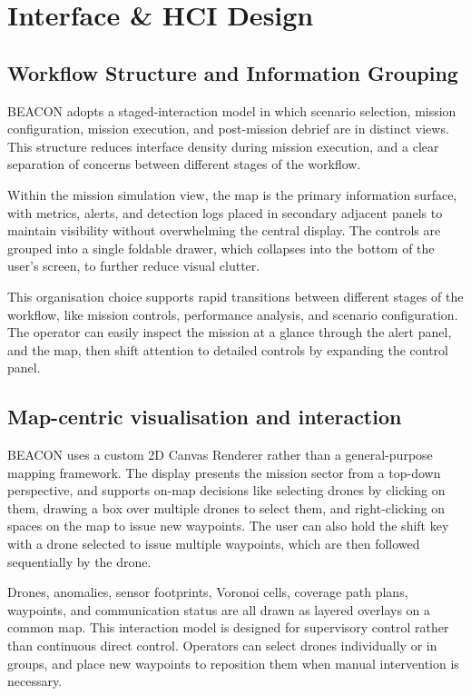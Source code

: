 \section{Interface \& HCI Design}\label{sec:interface-and-hci-design}

\subsection{Workflow Structure and Information Grouping}\label{subsec:workflow-structure-and-information-grouping}

BEACON adopts a staged-interaction model in which scenario selection, mission configuration, mission execution, and post-mission debrief are in distinct views.
This structure reduces interface density during mission execution, and a clear separation of concerns between different stages of the workflow.

Within the mission simulation view, the map is the primary information surface, with metrics, alerts, and detection logs placed in secondary adjacent panels to maintain visibility without overwhelming the central display.
The controls are grouped into a single foldable drawer, which collapses into the bottom of the user's screen, to further reduce visual clutter.

This organisation choice supports rapid transitions between different stages of the workflow, like mission controls, performance analysis, and scenario configuration.
The operator can easily inspect the mission at a glance through the alert panel, and the map, then shift attention to detailed controls by expanding the control panel.

\subsection{Map-centric visualisation and interaction}\label{subsec:map-centric-visualisation-and-interaction}

BEACON uses a custom 2D Canvas Renderer rather than a general-purpose mapping framework.
The display presents the mission sector from a top-down perspective, and supports on-map decisions like selecting drones by clicking on them, drawing a box over multiple drones to select them, and right-clicking on spaces on the map to issue new waypoints.
The user can also hold the shift key with a drone selected to issue multiple waypoints, which are then followed sequentially by the drone.

Drones, anomalies, sensor footprints, Voronoi cells, coverage path plans, waypoints, and communication status are all drawn as layered overlays on a common map.
This interaction model is designed for supervisory control rather than continuous direct control.
Operators can select drones individually or in groups, and place new waypoints to reposition them when manual intervention is necessary.

